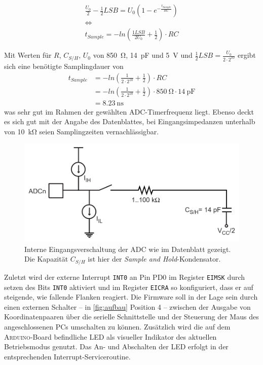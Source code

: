 		\begin{gather}
			\frac{U_0}{2} - \frac{1}{2}LSB = U_0 \left( 1 - e^{-\frac{t_{Sample}}{RC}} \right) \nonumber \\
			\Leftrightarrow \nonumber \\
			t_{Sample} = -ln\left( \frac{1LSB}{2U_0} + \frac{1}{2}\right) \cdot RC
			\label{eq:samplingzeit}
		\end{gather}

		Mit Werten für \(R\), \(C_{S/H}\), \(U_0\) von \SI{850}{\ohm}, \SI{14}{\pico\farad} und \SI{5}{\volt} und \(\frac{1}{2}LSB = \frac{U_0}{2 \cdot 2^{10}}\) ergibt sich eine benötigte Samplingdauer von
		\begin{align}
			t_{Sample}	&= -ln\left( \frac{1}{2\cdot 2^{10}} + \frac{1}{2}\right) \cdot RC \nonumber \\
						&= -ln\left( \frac{1}{2\cdot 2^{10}} + \frac{1}{2}\right) \cdot \SI{850}{\ohm} \cdot \SI{14}{\pico\farad} \nonumber \\
						&= \SI{8,23}{\nano\second}
			\label{eq:samplingzeit gerechnet}
		\end{align}
		was sehr gut im Rahmen der gewählten ADC-Timerfrequenz liegt.
		Ebenso deckt es sich gut mit der Angabe des Datenblattes, bei Eingangsimpedanzen unterhalb von \SI{10}{\kilo\ohm} seien Samplingzeiten vernachlässigbar.
		\begin{figure}[h]
			\centering
			\includegraphics[width=.8\textwidth]{fig/adc-input-circuit.png}
			\caption[Interne Eingangsverschaltung der ADC]{Interne Eingangsverschaltung der ADC wie im Datenblatt gezeigt. Die Kapazität \(C_{S/H}\) ist hier der \textit{Sample and Hold}-Kondensator.}
			\label{fig:analog input circuitry}
		\end{figure}

		Zuletzt wird der externe Interrupt \texttt{INT0} an Pin PD0 im Register \texttt{EIMSK} durch setzen des Bits \texttt{INT0} aktiviert und im Register \texttt{EICRA} so konfiguriert, dass er auf steigende, wie fallende Flanken reagiert.
		Die Firmware soll in der Lage sein durch einen externen Schalter -- in \cref{fig:aufbau} Position 4 -- zwischen der Ausgabe von Koordinatenpaaren über die serielle Schnittstelle und der Steuerung der Maus des angeschlossenen PCs umschalten zu können. Zusätzlich wird die auf dem \textsc{Arduino}-Board befindliche LED als visueller Indikator des aktuellen Betriebsmodus genutzt.
		Das An- und Abschalten der LED erfolgt in der entsprechenden Interrupt-Serviceroutine.\par

